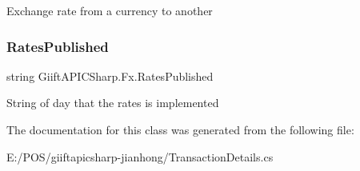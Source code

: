 Exchange rate from a currency to another 

\mbox{\label{class_giift_a_p_i_c_sharp_1_1_fx_a2c94740f3666608ee8469846fd628d94}} 
\subsubsection{\texorpdfstring{Rates\+Published}{RatesPublished}}
{\footnotesize\ttfamily string Giift\+A\+P\+I\+C\+Sharp.\+Fx.\+Rates\+Published}



String of day that the rates is implemented 



The documentation for this class was generated from the following file\+:\begin{DoxyCompactItemize}
\item 
E\+:/\+P\+O\+S/giiftapicsharp-\/jianhong/Transaction\+Details.\+cs\end{DoxyCompactItemize}
